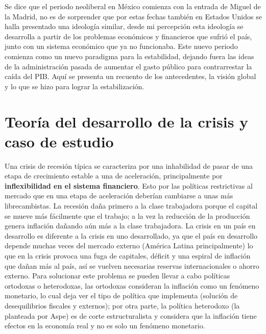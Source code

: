 Se dice que el periodo neoliberal en México comienza con la entrada de Miguel de la Madrid, no es de sorprender que por estas fechas también en Estados Unidos se halla presentado una ideología similar, desde mi percepción esta ideología se desarrolla a partir de los problemas económicos y financieros que sufrió el país, junto con un sistema económico que ya no funcionaba. Este nuevo periodo comienza como un nuevo paradigma para la estabilidad, dejando fuera las ideas de la administración pasada de aumentar el gasto público para contrarrestar la caída del PIB. Aquí se presenta un recuento de los antecedentes, la visión global y lo que se hizo para lograr la estabilización.


\section{Teoría del desarrollo de la crisis y caso de estudio}
Una crisis de recesión típica se caracteriza por una inhabilidad de pasar de una etapa de crecimiento estable a una de aceleración, principalmente por \textbf{inflexibilidad en el sistema financiero}.
Esto por las políticas restrictivas al mercado que en una etapa de aceleración deberían cambiarse a unas más librecambistas.
La recesión daña primero a la clase trabajadora porque el capital se mueve más fácilmente que el trabajo; a la vez la reducción de la producción genera inflación dañando aún más a la clase trabajadora.
La crisis en un país en desarrollo es diferente a la crisis en uno desarrollado, ya que el país en desarrollo depende muchas veces del mercado externo (América Latina principalmente) lo que en la crisis provoca una fuga de capitales, déficit y una espiral de inflación que dañan más al país, así se vuelven necesarias reservas internacionales o ahorro externo.
Para solucionar este problema se pueden llevar a cabo políticas ortodoxas o heterodoxas, las ortodoxas consideran la inflación como un fenómeno monetario, lo cual deja ver el tipo de política que implementa (solución de desequilibrios fiscales y externos); por otra parte, la política heterodoxo (la planteada por Aspe) es de corte estructuralista y considera que la inflación tiene efectos en la economía real y no es solo un fenómeno monetario.

